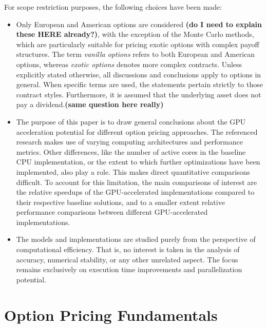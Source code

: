 \documentclass[english,12pt,a4paper,pdftex,sci,utf8]{aaltothesis}
\begin{document}
For scope restriction purposes, the following choices have been made:
\begin{itemize}
\item Only European and American options are considered \textbf{(do I need to explain these HERE already?)}, with the exception of the Monte Carlo methods, which are particularly suitable for pricing exotic options with complex payoff structures. The term \emph{vanilla options} refers to both European and American options, whereas \emph{exotic options} denotes more complex contracts. Unless explicitly stated otherwise, all discussions and conclusions apply to options in general. When specific terms are used, the statements pertain strictly to those contract styles. Furthermore, it is assumed that the underlying asset does not pay a dividend.\textbf{(same question here really)}
    
\item The purpose of this paper is to draw general conclusions about the GPU acceleration potential for different option pricing approaches. The referenced research makes use of varying computing architectures and performance metrics. Other differences, like the number of active cores in the baseline CPU implementation, or the extent to which further optimizations have been implemented, also play a role. This makes direct quantitative comparisons difficult. To account for this limitation, the main comparisons of interest are the relative speedups of the GPU-accelerated implementations compared to their respective baseline solutions, and to a smaller extent relative performance comparisons between different GPU-accelerated implementations.
    
\item The models and implementations are studied purely from the perspective of computational efficiency. That is, no interest is taken in the analysis of accuracy, numerical stability, or any other unrelated aspect. The focus remains exclusively on execution time improvements and parallelization potential.

\end{itemize}


\clearpage

\section{Option Pricing Fundamentals} \label{sec:theory}
\end{document}
